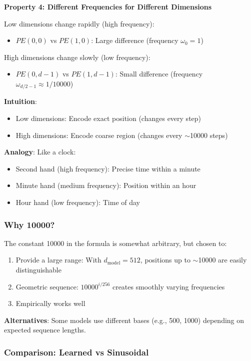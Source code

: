 \documentclass[11pt,oneside]{book}
\begin{document}
\textbf{Property 4: Different Frequencies for Different Dimensions}

Low dimensions change rapidly (high frequency):
\begin{itemize}
\item $PE(0, 0)$ vs $PE(1, 0)$: Large difference (frequency $\omega_0 = 1$)
\end{itemize}

High dimensions change slowly (low frequency):
\begin{itemize}
\item $PE(0, d-1)$ vs $PE(1, d-1)$: Small difference (frequency $\omega_{d/2-1} \approx 1/10000$)
\end{itemize}

\textbf{Intuition}:
\begin{itemize}
\item Low dimensions: Encode exact position (changes every step)
\item High dimensions: Encode coarse region (changes every $\sim$10000 steps)
\end{itemize}

\textbf{Analogy}: Like a clock:
\begin{itemize}
\item Second hand (high frequency): Precise time within a minute
\item Minute hand (medium frequency): Position within an hour
\item Hour hand (low frequency): Time of day
\end{itemize}

\subsubsection{Why 10000?}

The constant 10000 in the formula is somewhat arbitrary, but chosen to:
\begin{enumerate}
\item Provide a large range: With $d_{\text{model}} = 512$, positions up to $\sim$10000 are easily distinguishable
\item Geometric sequence: $10000^{i/256}$ creates smoothly varying frequencies
\item Empirically works well
\end{enumerate}

\textbf{Alternatives}: Some models use different bases (e.g., 500, 1000) depending on expected sequence lengths.

\subsubsection{Comparison: Learned vs Sinusoidal}
\end{document}
